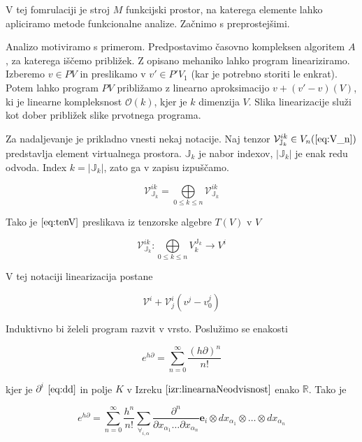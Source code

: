 \documentclass{article}
\newcommand{\RR}{\mathbb{R}}
\newcommand{\JJ}{\mathbb{J}}
\newcommand{\VV}{\mathcal{V}}
\newcommand{\e}{\mathbf{e}}
\newcommand{\D}{\partial}
\begin{document}
  V tej fomrulaciji je stroj $M$ funkcijski prostor,  na katerega elemente lahko apliciramo metode funkcionalne analize. Začnimo s preprostejšimi.
  
  Analizo motiviramo s primerom. Predpostavimo časovno kompleksen algoritem $A$, za katerega iščemo približek. Z opisano mehaniko lahko program lineariziramo.
  Izberemo $v\in PV$ in preslikamo v $v'\in P'V_1$ (kar je potrebno storiti le enkrat). Potem lahko program $PV$ približamo z linearno aproksimacijo $v+(v'-v) (V)$, ki je linearne kompleksnost $\mathcal{O}(k)$, kjer je $k$ dimenzija $V$.
  Slika linearizacije služi kot dober približek slike prvotnega programa.
  
  
  Za nadaljevanje je prikladno vnesti nekaj notacije. Naj tenzor $\VV^{ik}_{\JJ_k}\in V_n (\ref{eq:V_n})$ predstavlja element virtualnega prostora. $\JJ_k$ je nabor indexov, $\lvert\JJ_k\rvert$ je enak redu odvoda. Index $k=\lvert\JJ_k\rvert$, zato ga v zapisu izpuščamo. 
  
  \begin{equation}\label{eq:tenV}
  	\VV^{ik}_{\JJ_k}= \bigoplus\limits_{0\le k\le n} \VV^{ik}_{\JJ_k}
  \end{equation}
  
  Tako je $\eqref{eq:tenV}$ preslikava iz tenzorske algebre $T(V)$ v $V$
  
  \begin{equation}\label{eq:vto}
  	\VV^{ik}_{\JJ_k}:\bigoplus\limits_{0\le k\le n}V^{\JJ_k}_{k}\to V^i
  \end{equation}
  
  V tej notaciji linearizacija postane
  
  \begin{equation}\label{eq:linear}
 	\VV^i+\VV^i_j(v^j-v_0^j)
  \end{equation}
  
  Induktivno bi želeli program razvit v vrsto. Poslužimo se enakosti
  
 \begin{equation}
 	e^{h\D}=\sum\limits_{n=0}^{\infty}\frac{(h\D)^n}{n!}
 \end{equation}
 
 kjer je $\D^i$ $\eqref{eq:dd}$ in polje $K$ v Izreku $\ref{izr:linearnaNeodvisnost}$ enako $\RR$. Tako je
 
 \begin{equation}\label{eq:e^d}
 	e^{h\D}=\sum\limits_{n=0}^{\infty}\frac{h^n}{n!}\sum_{\forall_{i,\alpha}}\frac{\partial^n}{\partial
 		    x_{\alpha_1}\ldots \partial x_{\alpha_n}}\e_i\otimes
 		  dx_{\alpha_1}\otimes\ldots \otimes dx_{\alpha_n}
 \end{equation}
 
\end{document}
